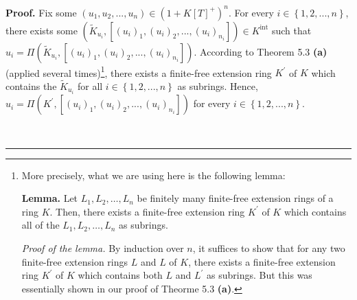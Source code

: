 \documentclass[numbers=enddot,12pt,final,onecolumn,notitlepage]{scrartcl}%
\newenvironment{proof}[1][Proof]{\noindent\textbf{#1.} }{\ \rule{0.5em}{0.5em}}
\begin{document}
\begin{proof}
Fix some $\left(  u_{1},u_{2},...,u_{n}\right)  \in\left(  1+K\left[
T\right]  ^{+}\right)  ^{n}$. For every $i\in\left\{  1,2,...,n\right\}  $,
there exists some $\left(  \widetilde{K}_{u_{i}},\left[  \left(  u_{i}\right)
_{1},\left(  u_{i}\right)  _{2},...,\left(  u_{i}\right)  _{n_{i}}\right]
\right)  \in K^{\operatorname*{int}}$ such that $u_{i}=\Pi\left(
\widetilde{K}_{u_{i}},\left[  \left(  u_{i}\right)  _{1},\left(  u_{i}\right)
_{2},...,\left(  u_{i}\right)  _{n_{i}}\right]  \right)  $. According to
Theorem 5.3 \textbf{(a)} (applied several times)\footnote{More precisely, what
we are using here is the following lemma:
\par
\textbf{Lemma.} Let $L_{1},L_{2},\ldots,L_{n}$ be finitely many finite-free
extension rings of a ring $K$. Then, there exists a finite-free extension ring
$K^{\prime}$ of $K$ which contains all of the $L_{1},L_{2},\ldots,L_{n}$ as
subrings.
\par
\textit{Proof of the lemma.} By induction over $n$, it suffices to show that
for any two finite-free extension rings $L$ and $L$ of $K$, there exists a
finite-free extension ring $K^{\prime}$ of $K$ which contains both $L$ and
$L^{\prime}$ as subrings. But this was essentially shown in our proof of
Theorme 5.3 \textbf{(a)}.}, there exists a finite-free extension ring
$K^{\prime}$ of $K$ which contains the $\widetilde{K}_{u_{i}}$ for all
$i\in\left\{  1,2,...,n\right\}  $ as subrings. Hence, $u_{i}=\Pi\left(
K^{\prime},\left[  \left(  u_{i}\right)  _{1},\left(  u_{i}\right)
_{2},...,\left(  u_{i}\right)  _{n_{i}}\right]  \right)  $ for every
$i\in\left\{  1,2,...,n\right\}  $.


\end{proof}
\end{document}

